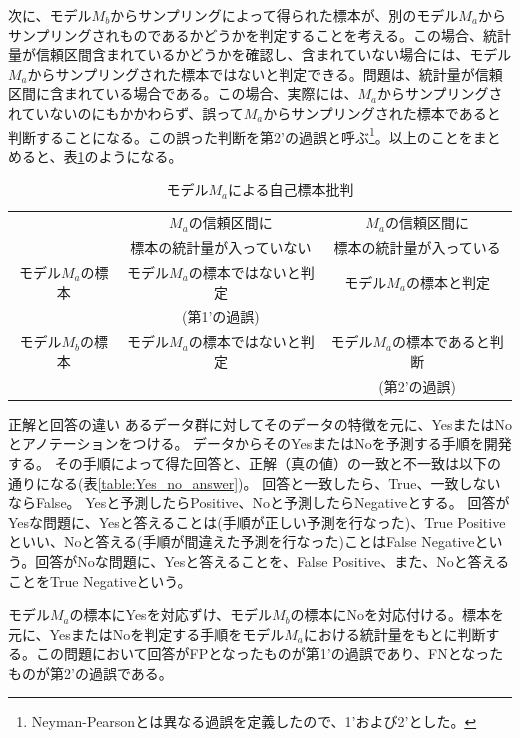 次に、モデル$M_b$からサンプリングによって得られた標本が、別のモデル$M_a$からサンプリングされものであるかどうかを判定することを考える。この場合、統計量が信頼区間含まれているかどうかを確認し、含まれていない場合には、モデル$M_a$からサンプリングされた標本ではないと判定できる。問題は、統計量が信頼区間に含まれている場合である。この場合、実際には、$M_a$からサンプリングされていないのにもかかわらず、誤って$M_a$からサンプリングされた標本であると判断することになる。この誤った判断を第2'の過誤と呼ぶ\footnote{Neyman-Pearsonとは異なる過誤を定義したので、1'および2'とした。}。以上のことをまとめると、表\ref{table:type_error}のようになる。

\begin{table}[hbtp]
    \caption{モデル$M_a$による自己標本批判}
    \label{table:type_error}
    \centering
    \begin{tabular}{ccc}
      \hline
        &  $M_a$の信頼区間に &  $M_a$の信頼区間に \\
        & 標本の統計量が入っていない & 標本の統計量が入っている \\
      \hline \hline
      モデル$M_a$の標本  & モデル$M_a$の標本ではないと判定  & モデル$M_a$の標本と判定 \\
      & (第1'の過誤) & \\
      モデル$M_b$の標本  & モデル$M_a$の標本ではないと判定   & モデル$M_a$の標本であると判断 \\
      & & (第2'の過誤) \\
      \hline
    \end{tabular}
  \end{table}


\begin{SMbox}{正解と回答の違い}
    あるデータ群に対してそのデータの特徴を元に、YesまたはNoとアノテーションをつける。
    データからそのYesまたはNoを予測する手順を開発する。
    その手順によって得た回答と、正解（真の値）の一致と不一致は以下の通りになる(表\ref{table:Yes_no_answer})。
    回答と一致したら、True、一致しないならFalse。
    Yesと予測したらPositive、Noと予測したらNegativeとする。
    回答がYesな問題に、Yesと答えることは(手順が正しい予測を行なった)、True Positiveといい、Noと答える(手順が間違えた予測を行なった)ことはFalse Negativeという。回答がNoな問題に、Yesと答えることを、False Positive、また、Noと答えることをTrue Negativeという。

    モデル$M_a$の標本にYesを対応ずけ、モデル$M_b$の標本にNoを対応付ける。標本を元に、YesまたはNoを判定する手順をモデル$M_a$における統計量をもとに判断する。この問題において回答がFPとなったものが第1'の過誤であり、FNとなったものが第2'の過誤である。
    \end{SMbox}
    
